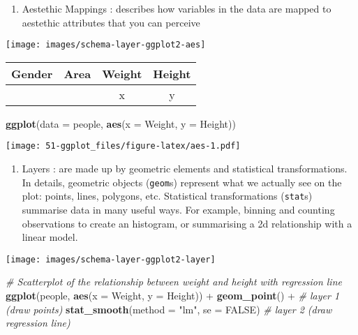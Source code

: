 \documentclass[]{book}
\newenvironment{Shaded}{\begin{snugshade}}{\end{snugshade}}
\newcommand{\KeywordTok}[1]{\textcolor[rgb]{0.13,0.29,0.53}{\textbf{{#1}}}}
\newcommand{\DataTypeTok}[1]{\textcolor[rgb]{0.13,0.29,0.53}{{#1}}}
\newcommand{\StringTok}[1]{\textcolor[rgb]{0.31,0.60,0.02}{{#1}}}
\newcommand{\CommentTok}[1]{\textcolor[rgb]{0.56,0.35,0.01}{\textit{{#1}}}}
\newcommand{\OtherTok}[1]{\textcolor[rgb]{0.56,0.35,0.01}{{#1}}}
\newcommand{\NormalTok}[1]{{#1}}
\providecommand{\tightlist}{%
  \setlength{\itemsep}{0pt}\setlength{\parskip}{0pt}}
\def\tightlist{}
\begin{document}
\begin{enumerate}
\def\labelenumi{\arabic{enumi}.}
\setcounter{enumi}{1}
\tightlist
\item
   {Aestethic Mappings} : describes how variables in the data are mapped
  to aestethic attributes that you can perceive
\end{enumerate}

\texttt{[image: images/schema-layer-ggplot2-aes]}

\begin{longtable}[]{@{}llcc@{}}
\toprule
Gender & Area & Weight & Height\tabularnewline
\midrule
\endhead
& & x & y\tabularnewline
\bottomrule
\end{longtable}

\begin{Shaded}
\begin{Highlighting}[]
\KeywordTok{ggplot}\NormalTok{(}\DataTypeTok{data =} \NormalTok{people, }\KeywordTok{aes}\NormalTok{(}\DataTypeTok{x =} \NormalTok{Weight, }\DataTypeTok{y =} \NormalTok{Height))}
\end{Highlighting}
\end{Shaded}

\texttt{[image: 51-ggplot\_files/figure-latex/aes-1.pdf]}

\begin{enumerate}
\def\labelenumi{\arabic{enumi}.}
\setcounter{enumi}{2}
\tightlist
\item
   {Layers} : are made up by geometric elements and statistical
  transformations. In details, geometric objects (\texttt{geom}s)
  represent what we actually see on the plot: points, lines, polygons,
  etc. Statistical transformations (\texttt{stat}s) summarise data in
  many useful ways. For example, binning and counting observations to
  create an histogram, or summarising a 2d relationship with a linear
  model.
\end{enumerate}

\texttt{[image: images/schema-layer-ggplot2-layer]}

\begin{Shaded}
\begin{Highlighting}[]
\CommentTok{# Scatterplot of the relationship between weight and height with regression line}
\KeywordTok{ggplot}\NormalTok{(people, }\KeywordTok{aes}\NormalTok{(}\DataTypeTok{x =} \NormalTok{Weight, }\DataTypeTok{y =} \NormalTok{Height)) +}
\StringTok{  }\KeywordTok{geom_point}\NormalTok{() +}\StringTok{ }\CommentTok{# layer 1 (draw points)}
\StringTok{  }\KeywordTok{stat_smooth}\NormalTok{(}\DataTypeTok{method =} \StringTok{"lm"}\NormalTok{, }\DataTypeTok{se =} \OtherTok{FALSE}\NormalTok{) }\CommentTok{# layer 2 (draw regression line) }
\end{Highlighting}
\end{Shaded}
\end{document}
